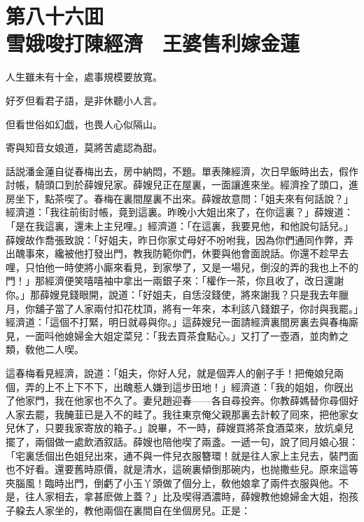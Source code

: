 
\chapter*{第八十六囬　\\雪娥唆打陳經濟　王婆售利嫁金蓮}


\begin{myquote}
人生雖未有十全，處事規模要放寬。

好歹但看君子語，是非休聽小人言。

但看世俗如幻戯，也畏人心似隔山。

寄與知音女娘道，莫將苦處認為甜。
\end{myquote}

話説潘金蓮自従春梅出去，房中納悶，不題。單表陳經濟，次日早飯時出去，假作討帳，騎頭口到於薛嫂兒家。薛嫂兒正在屋裏，一面讓進來坐。經濟拴了頭口，進房坐下，點茶喫了。春梅在裏間屋裏不出來。薛嫂故意問：「姐夫來有何話說？」經濟道：「我往前街討帳，竟到這裏。昨晚小大姐出來了，在你這裏？」薛嫂道：「是在我這裏，還未上主兒哩。」經濟道：「在這裏，我要見他，和他說句話兒。」薛嫂故作喬張致說：「好姐夫，昨日你家丈母好不吩咐我，因為你們通同作弊，弄出醜事來，纔被他打發出門，教我防範你們，休要與他會面說話。你還不趁早去哩，只怕他一時使將小廝來看見，到家學了，又是一場兒，倒沒的弄的我也上不的門！」那經濟便笑嘻嘻袖中拿出一兩銀子來：「權作一茶，你且收了，改日還謝你。」那薛嫂見錢眼開，說道：「好姐夫，自恁沒錢使，將來謝我？只是我去年臘月，你舖子當了人家兩付扣花枕頂，將有一年來，本利該八錢銀子，你討與我罷。」經濟道：「這個不打緊，明日就尋與你。」這薛嫂兒一面請經濟裏間房裏去與春梅廝見，一面呌他媳婦金大姐定菜兒：「我去買茶食點心。」又打了一壺酒，並肉鮓之類，敎他二人喫。

這春梅看見經濟，說道：「姐夫，你好人兒，就是個弄人的劊子手！把俺娘兒兩個，弄的上不上下不下，出醜惹人嫌到這步田地！」經濟道：「我的姐姐，你旣出了他家門，我在他家也不久了。妻兒趙迎春——各自尋投奔。你教薛媽替你尋個好人家去罷，我醃韮已是入不的畦了。我往東京俺父親那裏去計較了囘來，把他家女兒休了，只要我家寄放的箱子。」說畢，不一時，薛嫂買將茶食酒菜來，放炕桌兒擺了，兩個做一處飲酒叙話。薛嫂也陪他喫了兩盞。一遞一句，說了囘月娘心狠：「宅裏恁個出色姐兒出來，通不與一件兒衣服簪環！就是往人家上主兒去，裝門面也不好看。還要舊時原價，就是清水，這碗裏傾倒那碗内，也抛撒些兒。原來這等夾腦風！臨時出門，倒虧了小玉丫頭做了個分上，敎他娘拿了兩件衣服與他。不是，往人家相去，拿甚麽做上蓋？」比及喫得酒濃時，薛嫂教他媳婦金大姐，抱孩子躱去人家坐的，教他兩個在裏間自在坐個房兒。正是：

